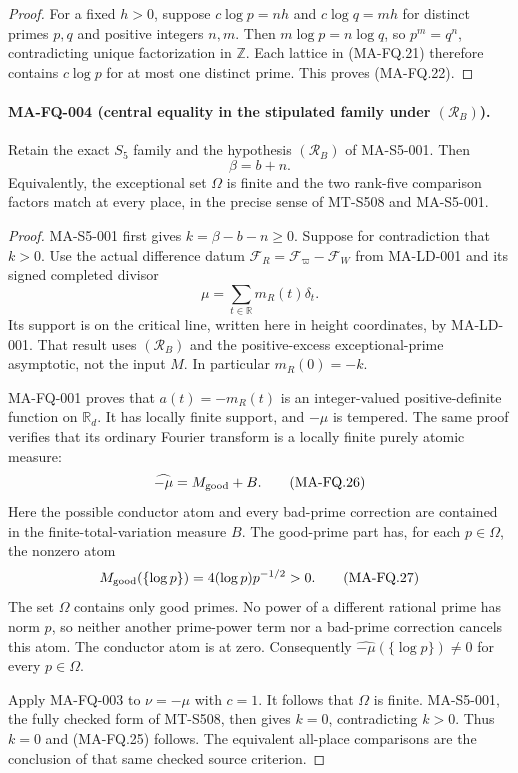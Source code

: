 \begin{proof}
For a fixed $h>0$, suppose $c\log p=nh$ and
$c\log q=mh$ for distinct primes $p,q$ and positive
integers $n,m$.  Then $m\log p=n\log q$, so
$p^m=q^n$, contradicting unique factorization in
$\mathbb Z$.  Each lattice in (MA-FQ.21) therefore
contains $c\log p$ for at most one distinct prime.
This proves (MA-FQ.22).
\end{proof}

\paragraph{MA-FQ-004 (central equality in the stipulated family under
$(\mathcal R_B)$).}
Retain the exact $S_5$ family and the hypothesis
$(\mathcal R_B)$ of MA-S5-001.  Then
\[
                              \boxed{\beta=b+n.}
\tag{MA-FQ.25}
\]
Equivalently, the exceptional set $\Omega$ is finite and
the two rank-five comparison factors match at every place,
in the precise sense of MT-S508 and MA-S5-001.

\begin{proof}
MA-S5-001 first gives $k=\beta-b-n\ge0$.
Suppose for contradiction that $k>0$.
Use the actual difference datum
$\mathcal F_R=\mathcal F_{\varpi}-\mathcal F_W$ from
MA-LD-001 and its signed completed divisor
\[
              \mu=\sum_{t\in\mathbb R}m_R(t)\delta_t.
\]
Its support is on the critical line, written here in
height coordinates, by MA-LD-001.  That result uses
$(\mathcal R_B)$ and the positive-excess exceptional-prime
asymptotic, not the input $M$.
In particular $m_R(0)=-k$.

MA-FQ-001 proves that
$a(t)=-m_R(t)$ is an integer-valued positive-definite
function on $\mathbb R_d$.  It has locally finite support,
and $-\mu$ is tempered.  The same proof verifies that its
ordinary Fourier transform is a locally finite purely
atomic measure:
\[
                       \widehat{-\mu}=M_{\rm good}+B.
\tag{MA-FQ.26}
\]
Here the possible conductor atom and every bad-prime
correction are contained in the finite-total-variation
measure $B$.  The good-prime part has, for each
$p\in\Omega$, the nonzero atom
\[
              M_{\rm good}(\{\log p\})
                        =4(\log p)p^{-1/2}>0.
\tag{MA-FQ.27}
\]
The set $\Omega$ contains only good primes.  No power
of a different rational prime has norm $p$, so neither
another prime-power term nor a bad-prime correction
cancels this atom.  The conductor atom is at zero.
Consequently $\widehat{-\mu}(\{\log p\})\ne0$ for every
$p\in\Omega$.

Apply MA-FQ-003 to $\nu=-\mu$ with $c=1$.
It follows that $\Omega$ is finite.
MA-S5-001, the fully checked form of MT-S508,
then gives $k=0$, contradicting $k>0$.
Thus $k=0$ and (MA-FQ.25) follows.  The equivalent
all-place comparisons are the conclusion of that same
checked source criterion.
\end{proof}

